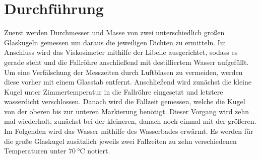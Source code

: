 
\section{Durchführung}
\label{sec:Durchführung}
Zuerst werden Durchmesser und Masse von zwei unterschiedlich großen Glaskugeln
gemessen um daraus die jeweiligen Dichten zu ermitteln. Im Anschluss wird das
Viskosimeter mithilfe der Libelle ausgerichtet, sodass es gerade steht und die Fallröhre anschließend
mit destilliertem Wasser aufgefüllt. Um eine Verfälschung der Messzeiten durch
Luftblasen zu vermeiden, werden diese vorher mit einem Glasstab entfernt.
Anschließend wird zunächst die kleine Kugel unter Zimmertemperatur in die
Fallröhre eingesetzt und letztere wasserdicht verschlossen. Danach wird die Fallzeit
gemessen, welche die Kugel von der oberen bis zur unteren Markierung benötigt.
Dieser Vorgang wird zehn mal wiederholt, zunächst bei der kleineren, danach noch einmal
mit der größeren. Im Folgenden wird das Wasser mithilfe des Wasserbades erwärmt. Es
werden für die große Glaskugel zusätzlich jeweils zwei Fallzeiten zu zehn
verschiedenen Temperaturen unter $\SI{70}{\degreeCelsius}$ notiert.
